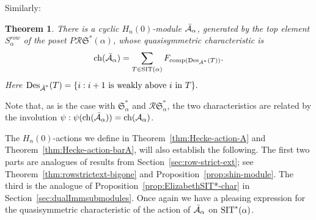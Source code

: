 \documentclass[12pt,letterpaper]{amsart}
\newtheorem{theorem}{Theorem}[section]
\theoremstyle{definition}
\DeclareMathOperator{\comp}{comp}
\newcommand{\dI}{\mathfrak{S}^*}
\newcommand{\rdI}{\mathcal{R}\mathfrak{S}^*}
\DeclareMathOperator{\Des}{Des}
\newcommand{\hn}{H_n(0)}
\begin{document}
Similarly:

\begin{theorem}\label{thm:Hecke-module-barA}  There is a cyclic $\hn$-module $\mathcal{\operatorname{\bar{\mathcal{A}}}}_\alpha$, generated by the top element  $S^{row}_\alpha$ of the poset $P\rdI(\alpha)$,  whose quasisymmetric characteristic is
\[ \chr({\bA_\alpha})=
\sum_{T\in \SIT(\alpha)} F_{\comp(\Des_{\bA^*}(T))}.\]
Here $\Des_{\bA^*}(T)=\{i: i+1 \text{ is weakly above  } i \text{ in }T\}.$
\end{theorem}

Note that, as is the case with $\dI_\alpha$ and $\rdI_\alpha$,  the two characteristics are related by the involution $\psi: \psi(\operatorname{\mathrm{ch}}({\operatorname{\bar{\mathcal{A}}}_\alpha}))=
 \operatorname{\mathrm{ch}}({\mathcal{A}_\alpha})$.
 
The $\hn$-actions we define in Theorem~\ref{thm:Hecke-action-A} and Theorem~\ref{thm:Hecke-action-barA}, will also establish the following. The first two parts are analogues of results from  Section~\ref{sec:row-strict-ext}; see  Theorem~\ref{thm:rowstrictext-bigone} and Proposition~\ref{prop:shin-module}.  The third is the analogue of Proposition~\ref{prop:ElizabethSIT*-char} in Section~\ref{sec:dualImmsubmodules}.   Once again we have a pleasing expression for the quasisymmetric characteristic of the action of $\operatorname{\bar{\mathcal{A}}}_\alpha$ on $\operatorname{SIT}^*(\alpha)$.
\end{document}
